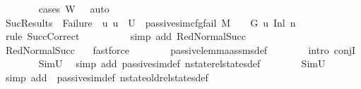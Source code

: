 \begin{isabellebody}
\ \ \ \ \ \ \isamarkupfalse%
\ {\isacharparenleft}{\kern0pt}cases\ {\isachardoublequoteopen}W\ {\isacharequal}{\kern0pt}\ {\isacharbrackleft}{\kern0pt}{\isacharbrackright}{\kern0pt}{\isachardoublequoteclose}{\isacharparenright}{\kern0pt}\ auto\ \ \ \ \ \ \isanewline
\ \ \ \ \isamarkupfalse%
\ SucResult{\isacharcolon}{\kern0pt}{\isachardoublequoteopen}s{\isacharprime}{\kern0pt}\ {\isacharequal}{\kern0pt}\ Failure\ {\isasymlongrightarrow}\ {\isacharparenleft}{\kern0pt}{\isasymexists}u{\isachardot}{\kern0pt}\ u\ {\isasymin}\ U{}\ {\isasymand}\ passive{\isacharunderscore}{\kern0pt}sim{\isacharunderscore}{\kern0pt}cfg{\isacharunderscore}{\kern0pt}fail\ M\ {\isasymLambda}{}\ {\isasymGamma}\ {\isasymOmega}\ G{}\ u\ {\isacharparenleft}{\kern0pt}Inl\ n{\isacharprime}{\kern0pt}{\isacharparenright}{\kern0pt}{\isacharparenright}{\kern0pt}{\isachardoublequoteclose}\ \ \isanewline
\ \ \ \ \ \ \isamarkupfalse%
\ {\isacharparenleft}{\kern0pt}rule\ SuccCorrect{\isacharparenright}{\kern0pt}\isanewline
\ \ \ \ \ \ \ \ \isamarkupfalse%
\ {\isacharparenleft}{\kern0pt}simp\ add{\isacharcolon}{\kern0pt}\ RedNormalSucc{\isacharparenright}{\kern0pt}\isanewline
\ \ \ \ \ \ \isamarkupfalse%
\ RedNormalSucc\ {}\ \isamarkupfalse%
\ fastforce\isanewline
\ \ \ \ \ \ \isamarkupfalse%
\ passive{\isacharunderscore}{\kern0pt}lemma{\isacharunderscore}{\kern0pt}assms{\isacharunderscore}{\kern0pt}{}{\isacharunderscore}{\kern0pt}def\isanewline
\ \ \ \ \ \ \isamarkupfalse%
\ {\isacharparenleft}{\kern0pt}intro\ conjI{\isacharparenright}{\kern0pt}\isanewline
\ \ \ \ \ \ \isamarkupfalse%
\ SimU{}\ \isamarkupfalse%
\ {\isacharparenleft}{\kern0pt}simp\ add{\isacharcolon}{\kern0pt}\ passive{\isacharunderscore}{\kern0pt}sim{\isacharunderscore}{\kern0pt}def\ nstate{\isacharunderscore}{\kern0pt}rel{\isacharunderscore}{\kern0pt}states{\isacharunderscore}{\kern0pt}def{\isacharparenright}{\kern0pt}\isanewline
\ \ \ \ \ \ \isamarkupfalse%
\ SimU{}\ \isamarkupfalse%
\ {\isacharparenleft}{\kern0pt}simp\ add{\isacharcolon}{\kern0pt}\ \ passive{\isacharunderscore}{\kern0pt}sim{\isacharunderscore}{\kern0pt}def\ nstate{\isacharunderscore}{\kern0pt}old{\isacharunderscore}{\kern0pt}rel{\isacharunderscore}{\kern0pt}states{\isacharunderscore}{\kern0pt}def{\isacharparenright}{\kern0pt}\isanewline

\end{isabellebody}

